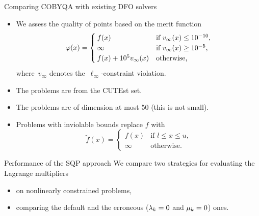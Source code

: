 \documentclass[
]{talk}
\newcommand{\drawprofiles}[3]{%
    \def\selectsolvers{#1}%
    \def\selectcsv{figures/#2}%
    \def\selectprofile{#3}%
    \def\selectxlabel{$\log_2(\text{Perf.\ ratio})$}%
    \def\selectylabel{Perf.\ profiles ($\tau = 10^{-#3}$)}%
}
\newcommand*{\iter}[1][]{x\ifblank{#1}{}{_{#1}}}
\newcommand*{\lmeq}[1][]{\mu\ifblank{#1}{}{_{#1}}}
\newcommand*{\lmub}[1][]{\lambda\ifblank{#1}{}{_{#1}}}
\newcommand*{\obj}{f}
\newcommand*{\xl}{l}
\newcommand*{\xu}{u}
\begin{document}
\begin{frame}{Comparing COBYQA with existing DFO solvers}
    \begin{itemize}
        \item We assess the quality of points based on the merit function
        \begin{equation*}
            \varphi(\iter) =
            \begin{cases}
                \obj(\iter)                           & \text{if~$v_{\infty}(x) \le 10^{-10}$,}\\
                \infty                                & \text{if~$v_{\infty}(x) \ge 10^{-5}$,}\\
                \obj(\iter) + 10^5 v_{\infty}(\iter)  & \text{otherwise,}
            \end{cases}
        \end{equation*}
        where~$v_{\infty}$ denotes the~$\ell_{\infty}$-constraint violation.
        \item The problems are from the \alert{CUTEst} set.
        \item The problems are of \alert{dimension} at most \num{50} (this is \alert{not} small).
        \item Problems with \alert{inviolable} bounds replace $\obj$ with
        \begin{equation*}
            \tilde{\obj}(x) =
            \begin{cases}
                \obj(x) & \text{if~$\xl \le x \le \xu$,}\\
                \infty  & \text{otherwise.}
            \end{cases}
        \end{equation*}
    \end{itemize}
\end{frame}

\begin{frame}{Performance of the SQP approach}
    We compare two strategies for evaluating the Lagrange multipliers
    \begin{itemize}
        \item on \alert{nonlinearly constrained} problems,
        \item comparing the default and the \alert{erroneous} ($\lmub[k] = 0$ and $\lmeq[k] = 0$) ones.
    \end{itemize}

    \smallskip

    \begin{center}
        \drawprofiles{{"Default","Erroneous"}}{plain-1-50-perf-cobyqa-wrong-hessian-qo.csv}{4}
    \end{center}
\end{frame}
\end{document}
